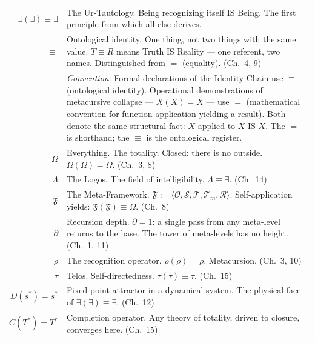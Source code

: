 \documentclass[10pt, openany, oneside]{book}
\renewcommand{\footnotesize}{\fontsize{8.5}{11}\selectfont}
\begin{document}
\vspace{1em}

{\footnotesize
\noindent\begin{tabular}{@{} r @{\hspace{0.6em}} p{} @{}}
$\exists(\exists) \equiv \exists$ & The Ur-Tautology. Being recognizing itself IS Being. The first principle from which all else derives. \\[0.3em]
$\equiv$ & Ontological identity. One thing, not two things with the same value. $T \equiv R$ means Truth IS Reality --- one referent, two names. Distinguished from $=$ (equality). (Ch.\ 4, 9) \\[0.3em]
& \textit{Convention}: Formal declarations of the Identity Chain use $\equiv$ (ontological identity). Operational demonstrations of metacursive collapse --- $X(X) = X$ --- use $=$ (mathematical convention for function application yielding a result). Both denote the same structural fact: $X$ applied to $X$ IS $X$. The $=$ is shorthand; the $\equiv$ is the ontological register. \\[0.3em]
$\Omega$ & Everything. The totality. Closed: there is no outside. $\Omega(\Omega) = \Omega$. (Ch.\ 3, 8) \\[0.3em]
$\Lambda$ & The Logos. The field of intelligibility. $\Lambda \equiv \exists$. (Ch.\ 14) \\[0.3em]
$\mathfrak{F}$ & The Meta-Framework. $\mathfrak{F} := \langle \mathcal{O}, \mathcal{S}, \mathcal{T}, \mathcal{T}_m, \mathcal{R} \rangle$. Self-application yields: $\mathfrak{F}(\mathfrak{F}) \equiv \Omega$. (Ch.\ 8) \\[0.3em]
$\partial$ & Recursion depth. $\partial = 1$: a single pass from any meta-level returns to the base. The tower of meta-levels has no height. (Ch.\ 1, 11) \\[0.3em]
$\rho$ & The recognition operator. $\rho(\rho) = \rho$. Metacursion. (Ch.\ 3, 10) \\[0.3em]
$\tau$ & Telos. Self-directedness. $\tau(\tau) \equiv \tau$. (Ch.\ 15) \\[0.3em]
$D(s^*)=s^*$ & Fixed-point attractor in a dynamical system. The physical face of $\exists(\exists) \equiv \exists$. (Ch.\ 12) \\[0.3em]
$C(T^*)=T^*$ & Completion operator. Any theory of totality, driven to closure, converges here. (Ch.\ 15) \\[0.3em]
\end{tabular}
}

\vspace{0.5em}
\end{document}
